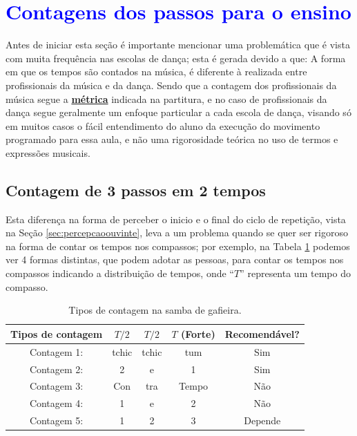 \section{\textcolor{blue}{Contagens dos passos para o ensino}}
Antes de iniciar esta seção é importante mencionar uma
problemática que é vista com muita frequência nas escolas de dança; 
esta é gerada devido a que: A forma em que os tempos são contados 
na música, é
diferente à realizada entre profissionais da música e da dança. 
Sendo que a contagem dos profissionais da música segue a \hyperref[def:Metrica]{\textbf{métrica}} indicada na partitura,
e no caso de profissionais da dança segue geralmente um enfoque 
particular a cada escola de dança, visando só em muitos casos o fácil entendimento do aluno da
execução do movimento programado para essa aula, e não uma rigorosidade teórica no uso de termos e 
expressões musicais.




\subsection{Contagem de 3 passos em 2 tempos}
Esta diferença na forma de perceber o inicio e o final do ciclo de repetição,
vista na Seção \ref{sec:percepcaoouvinte}, 
leva a um problema quando se quer ser rigoroso na forma de contar os tempos nos compassos; 
por exemplo, na Tabela \ref{tab:ritmo1} 
podemos ver 4 formas distintas, que podem adotar as pessoas, 
para contar os tempos nos compassos indicando a distribuição de tempos, 
onde ``$T$'' representa um tempo do compasso.
\begin{table}[ht]
  \centering
  \begin{tabular}    {c|ccc|c}
    \hline
    Tipos de contagem       & $T/2$ & $T/2$   & $T$ (Forte) & Recomendável?\\
    \hline
    Contagem 1: & tchic  & tchic  & tum   & Sim\\
    Contagem 2: & 2     & e     & 1     & Sim\\ \hline
    Contagem 3: & Con   & tra  & Tempo & Não\\
    Contagem 4: & 1     & e     & 2     & Não\\  \hline
    Contagem 5: & 1     & 2     & 3     & Depende\\ \hline
    \hline
  \end{tabular}
  \caption{Tipos de contagem na samba de gafieira.}
\label{tab:ritmo1}
\end{table}


